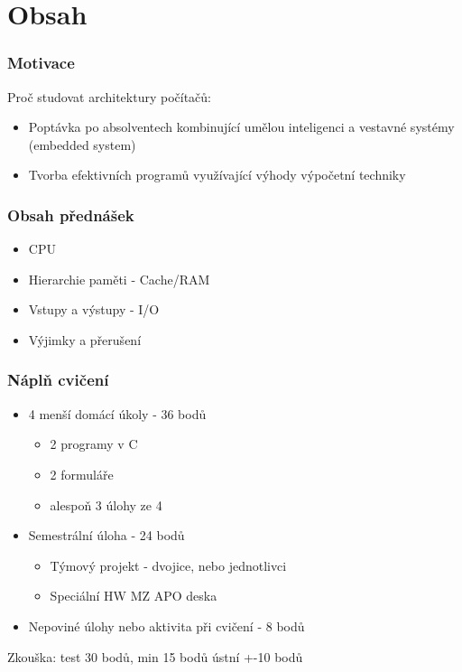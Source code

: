\documentclass{beamer}
\subtitle{Lekce 01. Úvod}
\author{Petr Štěpán\\ \small\texttt{stepan@fel.cvut.cz}}
\begin{document}
\maketitle

\section{Obsah}

\begin{frame}
\frametitle{Motivace}
Proč studovat architektury počítačů:
\begin{itemize}
\item Poptávka po absolventech kombinující umělou inteligenci a vestavné systémy (embedded system)
\item Tvorba efektivních programů využívající výhody výpočetní techniky
\end{itemize}

\end{frame}


\begin{frame}
\frametitle{Obsah přednášek}
\begin{itemize}
\item CPU
\item Hierarchie paměti - Cache/RAM
\item Vstupy a výstupy - I/O
\item Výjimky a přerušení
\end{itemize}
\end{frame}

\begin{frame}
\frametitle{Náplň cvičení}

\begin{itemize}
\item 4 menší domácí úkoly - 36 bodů
\begin{itemize}
\item 2 programy v C
\item 2 formuláře
\item alespoň 3 úlohy ze 4
\end{itemize}
\item Semestrální úloha - 24 bodů
\begin{itemize}
\item Týmový projekt - dvojice, nebo jednotlivci
\item Speciální HW MZ APO deska
\end{itemize}
\item Nepoviné úlohy nebo aktivita při cvičení - 8 bodů
\end{itemize}

Zkouška: test 30 bodů, min 15 bodů
ústní +-10 bodů    
\end{frame}
\end{document}
